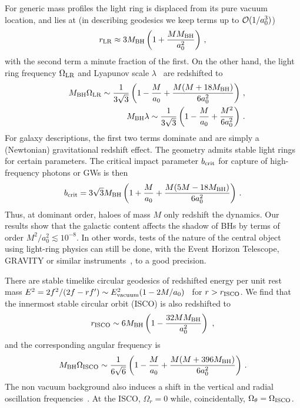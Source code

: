 \documentclass[twocolumn,preprintnumbers,nofootinbib,prd,superscriptaddress,aps]{revtex4-1}
\def\be{\begin{equation}}
\def\ee{\end{equation}}
\newcommand{\beq}{\begin{eqnarray}}
\newcommand{\eeq}{\end{eqnarray}}
\def\be{\begin{equation}}
\def\ee{\end{equation}}
\begin{document}
For generic mass profiles the light ring is displaced from its pure vacuum location, and lies at
(in describing geodesics we keep terms up to ${\cal O}(1/a_0^3)$)
%
\be
r_\textnormal{LR}\approx 3M_{\rm BH}\left(1+\frac{MM_{\rm BH}}{a_0^2}\right)\,,
\ee
%
with the second term a minute fraction of the first. On the other hand, the light ring frequency $\Omega_{\rm LR}$ and Lyapunov scale $\lambda$~\cite{Cardoso:2008bp} are redshifted to
%
\beq
&&M_{\rm BH}\Omega_{\rm LR}\sim \frac{1}{3\sqrt{3}}\left(1-\frac{M}{a_0}+\frac{M(M+18M_{\rm BH})}{6a_0^2}\right)\,,\label{eq:lr_redshift}\\
&&M_{\rm BH}\lambda\sim \frac{1}{3\sqrt{3}}\left(1-\frac{M}{a_0}+\frac{M^2}{6a_0^2}\right)\,.\label{eq:lr_lyapunov}
\eeq
%
For galaxy descriptions, the first two terms dominate and are simply a (Newtonian) gravitational redshift effect. The geometry admits stable light rings 
for certain parameters. The critical impact parameter $b_{\rm crit}$ for capture of high-frequency photons or GWs is then~\cite{chandrasekhar1992mathematical}
%
\be
b_{\rm crit}=3\sqrt{3}M_{\rm BH}\left(1+\frac{M}{a_0}+\frac{M(5M-18M_{\rm BH})}{6a_0^2}\right)\,.
\ee
%
Thus, at dominant order, haloes of mass $M$ only redshift the dynamics. Our results show that the galactic content
affects the shadow of BHs by terms of order $M^2/a_0^2\lesssim 10^{-8}$. In other words, tests of the nature of the central object using light-ring physics can still be done, with the Event Horizon Telescope, GRAVITY or similar instruments~\cite{EventHorizonTelescope:2019dse,2018A&A...618L..10G}, to a good precision.



There are stable timelike circular geodesics of redshifted energy per unit rest mass $E^2=2f^2/(2f-rf')\sim E^2_{\rm vacuum}(1-2M/a_0)$~\cite{Cardoso:2008bp} for $r>r_\textnormal{ISCO}$. 
We find that the innermost stable circular orbit (ISCO) is also redshifted to
%
%
\beq
r_\textnormal{ISCO}\sim 6M_\textnormal{BH}\left(1-\frac{32MM_\textnormal{BH}}{a_0^2}\right)\ ,
\eeq
%
and the corresponding angular frequency is 
\beq
M_{\rm BH}\Omega_{\rm ISCO}\sim \frac{1}{6\sqrt{6}}\left(1-\frac{M}{a_0}+\frac{M(M+396M_{\rm BH})}{6a_0^2}\right)\,. \nonumber \\\label{isco}
\eeq
%
The non vacuum background also induces a shift in the vertical and radial  
oscillation frequencies~\cite{Maselli:2014fca}. At the ISCO, $\Omega_r=0$ while, coincidentally,
$\Omega_\theta=\Omega_{\rm ISCO}$. 
\end{document}
